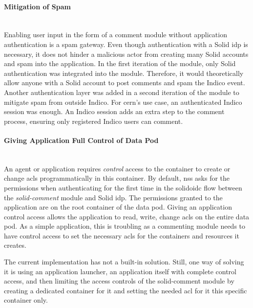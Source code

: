 \vspace{0.5cm}
\paragraph{Mitigation of Spam}\mbox{}\\

Enabling user input in the form of a comment module without application authentication is a spam gateway. Even though authentication with a Solid \gls{idp} is necessary, it does not hinder a malicious actor from creating many Solid accounts and spam into the application. In the first iteration of the module, only Solid authentication was integrated into the module. Therefore, it would theoretically allow anyone with a Solid account to post comments and spam the Indico event. Another authentication layer was added in a second iteration of the module to mitigate spam from outside Indico. For \gls{cern}’s use case, an authenticated Indico session was enough. An Indico session adds an extra step to the comment process, ensuring only registered Indico users can comment.
\vspace{0.5cm}
\paragraph{Giving Application Full Control of Data Pod}\mbox{}\\

An agent or application requires \textit{control} access to the container to create or change \glspl{acl} programmatically in this container. By default, \gls{nss} asks for the permissions when authenticating for the first time in the \gls{solidoidc} flow between the \textit{solid-comment} module and Solid \gls{idp}. The permissions granted to the application are on the root container of the data pod. Giving an application control access allows the application to read, write, change \glspl{acl} on the entire data pod. As a simple application, this is troubling as a commenting module needs to have control access to set the necessary \glspl{acl} for the containers and resources it creates.

The current implementation has not a built-in solution. Still, one way of solving it is using an application launcher, an application itself with complete control access, and then limiting the access controls of the solid-comment module by creating a dedicated container for it and setting the needed \gls{acl} for it this specific container only. 
\vspace{0.5cm}

